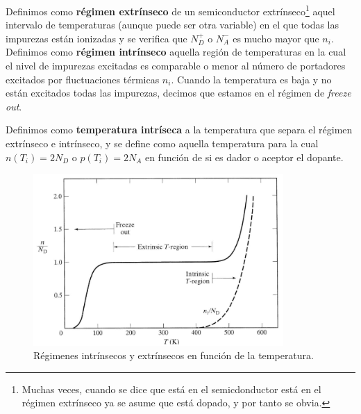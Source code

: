Definimos como \textbf{régimen extrínseco} de un semiconductor extrínseco\footnote{Muchas veces, cuando se dice que está en el semicdonductor está en el régimen extrínseco ya se asume que está dopado, y por tanto se obvia.} aquel intervalo de temperaturas (aunque puede ser otra variable) en el que todas las impurezas están ionizadas y se verifica que $N_D^+$ o $N_A^-$ es mucho mayor que $n_i$. Definimos como \textbf{régimen intrínseco} aquella región de temperaturas en la cual el nivel de impurezas excitadas es comparable o menor al número de portadores excitados por fluctuaciones térmicas $n_i$. Cuando la temperatura es baja y no están excitados todas las impurezas, decimos que estamos en el régimen de \textit{freeze out}.

Definimos como \textbf{temperatura intríseca} a la temperatura que separa el régimen extrínseco e intrínseco, y se define como aquella temperatura para la cual $n(T_i)=2N_D$ o $p(T_i)=2N_A$ en función de si es dador o aceptor el dopante.


\begin{figure}[h!] \centering
	\includegraphics[width=0.85\textwidth]{Cuerpo/Ch_01/01_06.png}
	\caption{Régimenes intrínsecos y extrínsecos en función de la temperatura.}
\end{figure}





\newpage


